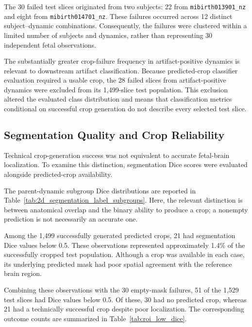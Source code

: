 The 30 failed test slices originated from two subjects: 22 from \texttt{mibirth013901\_nz} and eight from \texttt{mibirth014701\_nz}. These failures occurred across 12 distinct subject--dynamic combinations. Consequently, the failures were clustered within a limited number of subjects and dynamics, rather than representing 30 independent fetal observations.

The substantially greater crop-failure frequency in artifact-positive dynamics is relevant to downstream artifact classification. Because predicted-crop classifier evaluation required a usable crop, the 28 failed slices from artifact-positive dynamics were excluded from its 1,499-slice test population. This exclusion altered the evaluated class distribution and means that classification metrics conditional on successful crop generation do not describe every selected test slice.

\subsection{Segmentation Quality and Crop Reliability}
\label{subsec:results_crop_quality}

Technical crop-generation success was not equivalent to accurate fetal-brain localization. To examine this distinction, segmentation Dice scores were evaluated alongside predicted-crop availability.

The parent-dynamic subgroup Dice distributions are reported in Table~\ref{tab:2d_segmentation_label_subgroups}. Here, the relevant distinction is between anatomical overlap and the binary ability to produce a crop; a nonempty prediction is not necessarily an accurate one.

Among the 1,499 successfully generated predicted crops, 21 had segmentation Dice values below 0.5. These observations represented approximately 1.4\% of the successfully cropped test population. Although a crop was available in each case, its underlying predicted mask had poor spatial agreement with the reference brain region.

Combining these observations with the 30 empty-mask failures, 51 of the 1,529 test slices had Dice values below 0.5. Of these, 30 had no predicted crop, whereas 21 had a technically successful crop despite poor localization. The corresponding outcome counts are summarized in Table~\ref{tab:roi_low_dice}.

